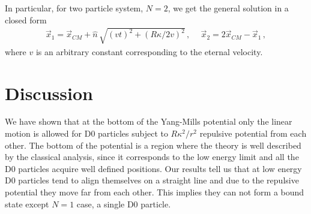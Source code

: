 \documentclass[a4paper,12pt]{article}
\begin{document}
In particular, for two particle system, $N=2$,  we get the general solution in a closed form
\begin{equation}
\begin{array}{cc}
\vec{x}_{1}=\vec{x}_{CM}+\hat{n}\,\displaystyle{\sqrt{(vt)^{2}+({\scriptstyle{R}}\kappa/2v)^{2}}}\,,~&~\vec{x}_{2}=2\vec{x}_{CM}-\vec{x}_{1}\,,
\end{array}
\end{equation}
where $v$ is an arbitrary constant  corresponding to the eternal  velocity.



\section{Discussion}
We have shown  that at the bottom of the Yang-Mills potential only the linear motion is allowed for D0 particles
subject to ${\scriptstyle R}\kappa^{2}/r^2$ repulsive potential from each other. The bottom of the potential is a
region where the theory is well described by the classical analysis, since it corresponds to the low energy limit
and all the D0 particles acquire well defined positions. Our results tell us  that at low energy D0 particles tend
to align themselves on a straight line and due to the repulsive potential they move far from each other. This
implies they can not form a bound state except $N=1$ case, a single D0 particle. \newline
\end{document}
